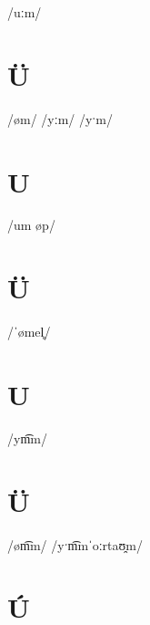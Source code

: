 \documentclass[10pt,a4paper,twoside]{book}
\begin{document}
\begin{multicols}{3}
 {/uːm/} {}
\end{multicols}

\section*{Ü}

\begin{multicols}{3}
 {/øm/} {}
 {/yːm/} {}
 {/yˑm/} {}
\end{multicols}

\section*{U}

\begin{multicols}{3}
 {/um øp/} {}
\end{multicols}

\section*{Ü}

\begin{multicols}{3}
 {/ˈømel̥/} {}
\end{multicols}

\section*{U}

\begin{multicols}{3}
 {/ym͡m/} {}
\end{multicols}

\section*{Ü}

\begin{multicols}{3}
 {/øm͡m/} {}
 {/yˑm͡mˈoːrtaʊ̯m/} {}
\end{multicols}

\section*{Ú}
\end{document}
